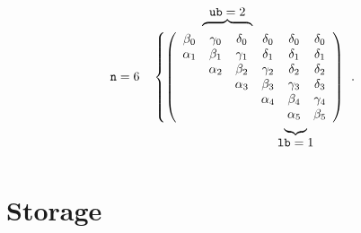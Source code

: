 \documentclass[10pt]{article}
\begin{document}
\begin{alignat}{2}
  \nonumber
  &&&\hspace{4.0em}\mbox{\raisebox{-1em}{$\overbrace{\hspace{4em}}^{\displaystyle\texttt{ub}=2}$}} \\
  &\texttt{n}=6  &
  &\left\{\left(
  \begin{array}{cccccccc}
    \beta_0 & \gamma_0 & \delta_0 & \delta_0 & \delta_0 &\delta_0 \\
    \alpha_1 & \beta_1 & \gamma_1 & \delta_1 & \delta_1 &\delta_1 \\
            & \alpha_2 & \beta_2 & \gamma_2 & \delta_2 &\delta_2 \\
            &         &  \alpha_3 & \beta_3 & \gamma_3 &\delta_3 \\
            &         &         & \alpha_4 & \beta_4 &\gamma_4 \\
            &         &         &         & \alpha_5 &\beta_5 \\
  \end{array}
  \right)\right.
  ~.\\
  \nonumber
  &&&\hspace{10.0em}\mbox{\raisebox{2em}{$\underbrace{\hspace{1.0em}}_{\displaystyle\texttt{lb}=1}$}}
\end{alignat}

\section{Storage}
\end{document}
